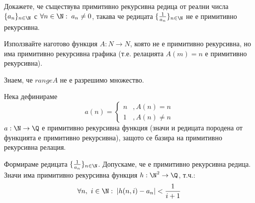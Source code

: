 \begin{problem}
    Докажете, че съществува примитивно рекурсивна редица от реални числа $\{a_n\}_{n\in\N}$ с $\forall n\in\N:\; a_n \neq 0$, такава че редицата $\{\frac{1}{a_n}\}_{n\in\N}$ не е примитивно рекурсивна.
\end{problem}
\begin{hint}
    Използвайте наготово функция $A : N \to N$, която не е примитивно рекурсивна, но има примитивно рекурсивна графика (т.е. релацията $A(m) = n$ е примитивно рекурсивна).
\end{hint}
\begin{solution}
    Знаем, че $range A$ не е разрешимо множество.

    Нека дефинираме 
    \begin{equation}
        a(n) = \begin{cases}
            n &, A(n) = n \\
            1 &, A(n) \neq n
        \end{cases}
    \end{equation}
    $a: \N \to \Q$ е примитивно рекурсивна функция  (значи и редицата породена от функцията е примитивно рекурсивна), защото се базира на примитивно рекурсивна релация.
    
    Формираме редицата $\{\frac{1}{a_n}\}_{n\in\N}$. Допускаме, че е примитивно рекурсивна редица. Значи има примитивно рекурсивна функция $h: \N^2 \to \Q$, т.ч.:
    \begin{equation}
        \forall n,\ i \in\N:\; |h(n,i) - a_n| < \frac{1}{i+1}
    \end{equation}
    
    
\end{solution}